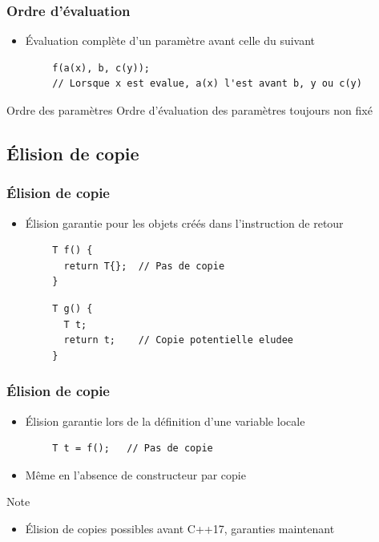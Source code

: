 \documentclass[C++.tex]{subfiles}
\begin{document}
\begin{frame}[fragile]
	\frametitle{Ordre d'évaluation}
	\begin{itemize}
		\item Évaluation complète d'un paramètre avant celle du suivant
	\end{itemize}

	\begin{verbatim}
		f(a(x), b, c(y));
		// Lorsque x est evalue, a(x) l'est avant b, y ou c(y)
	\end{verbatim}

	\begin{alertblock}{Ordre des paramètres}
		Ordre d'évaluation des paramètres toujours non fixé
	\end{alertblock}
\end{frame}

\subsection*{Élision de copie}
\begin{frame}[fragile]
	\frametitle{Élision de copie}
	\begin{itemize}
		\item Élision garantie pour les objets créés dans l'instruction de retour
	\end{itemize}

	\begin{verbatim}
		T f() {
		  return T{};  // Pas de copie
		}
	\end{verbatim}

	\begin{verbatim}
		T g() {
		  T t;
		  return t;    // Copie potentielle eludee
		}
	\end{verbatim}
\end{frame}

\begin{frame}[fragile]
	\frametitle{Élision de copie}
	\begin{itemize}
		\item Élision garantie lors de la définition d'une variable locale
	\end{itemize}

	\begin{verbatim}
		T t = f();   // Pas de copie
	\end{verbatim}

	\begin{itemize}
		\item Même en l'absence de constructeur par copie
	\end{itemize}

	\begin{block}{Note}
		\begin{itemize}
			\item Élision de copies possibles avant C++17, garanties maintenant
		\end{itemize}
	\end{block}
\end{frame}
\end{document}
